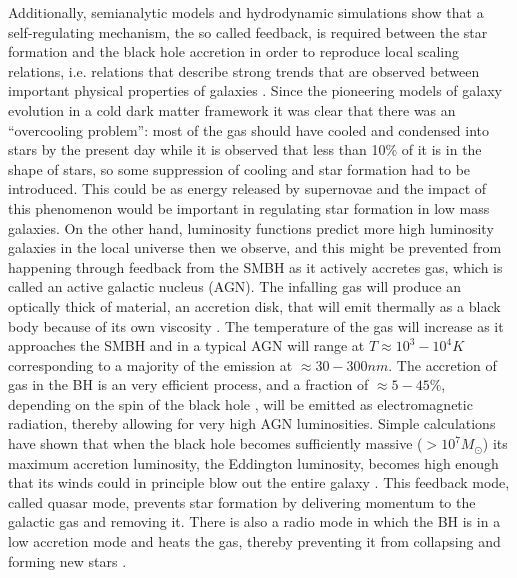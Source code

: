 Additionally, semianalytic models and hydrodynamic simulations show that a self-regulating mechanism, the so called feedback, is required between the star formation and the black hole accretion in order to reproduce local scaling relations, i.e. relations that describe strong trends that are observed between important physical properties of galaxies %
\citep[see][for a review]{2015ARA&A..53...51S}. Since the pioneering models of galaxy evolution in a cold dark matter framework it was clear that there was an ``overcooling problem'': most of the gas should have cooled and condensed into stars by the present day while it is observed that less than 10\% of it is in the shape of stars, so some suppression of cooling and star formation had to be introduced. This could be as energy released by supernovae \citep{1974MNRAS.169..229L,1978MNRAS.183..341W,1986ApJ...303...39D,1991ApJ...379...52W} and the impact of this phenomenon would be important in regulating star formation in low mass galaxies. On the other hand, luminosity functions predict more high luminosity galaxies in the local universe then we observe, and this might be prevented from happening through feedback from the SMBH as it actively accretes gas, which is called an active galactic nucleus (AGN).%
The infalling gas will produce an optically thick of material, an accretion disk, that will emit thermally as a black body because of its own viscosity \citep[e.g.][]{1973A&A....24..337S,1984ARA&A..22..471R}. The temperature of the gas will increase as it approaches the SMBH and in a typical AGN will range at $T \approx 10^3-10^4 K$ corresponding to a majority of the emission at $\approx 30-300 nm$. %
The accretion of gas in the BH is an very efficient process, and a fraction of $\approx 5-45\%$, depending on the spin of the black hole \citep[e.g.][]{1963PhRvL..11..237K,1983bhwd.book.....S}, will be emitted as electromagnetic radiation, thereby allowing for very high AGN luminosities.
Simple calculations have shown that when the black hole becomes sufficiently massive ($> 10^7 M_\odot$) its maximum accretion luminosity, the Eddington %
luminosity, becomes high enough that its winds could in principle blow out the entire galaxy %
\citep{1998A&A...331L...1S}. This feedback mode, called quasar mode, prevents star formation by delivering momentum to the galactic gas and removing it. There is also a radio mode in which the BH is in a low accretion mode and heats the gas, thereby preventing it from collapsing and forming new stars \citep{2017NatAs...1E.165H}.
    
